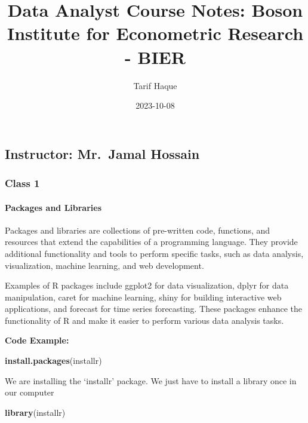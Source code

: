 \documentclass[
]{article}
\title{Data Analyst Course Notes: Boson Institute for Econometric
Research - BIER}
\author{Tarif Haque}
\date{2023-10-08}
\newenvironment{Shaded}{\begin{snugshade}}{\end{snugshade}}
\newcommand{\FunctionTok}[1]{\textcolor[rgb]{0.13,0.29,0.53}{\textbf{#1}}}
\newcommand{\NormalTok}[1]{#1}
\newcommand{\StringTok}[1]{\textcolor[rgb]{0.31,0.60,0.02}{#1}}
\begin{document}
\maketitle

\hypertarget{instructor-mr.-jamal-hossain}{%
\subsection{Instructor: Mr.~Jamal
Hossain}\label{instructor-mr.-jamal-hossain}}

\hypertarget{class-1}{%
\subsubsection{Class 1}\label{class-1}}

\hypertarget{packages-and-libraries}{%
\paragraph{Packages and Libraries}\label{packages-and-libraries}}

Packages and libraries are collections of pre-written code, functions,
and resources that extend the capabilities of a programming language.
They provide additional functionality and tools to perform specific
tasks, such as data analysis, visualization, machine learning, and web
development.

Examples of R packages include ggplot2 for data visualization, dplyr for
data manipulation, caret for machine learning, shiny for building
interactive web applications, and forecast for time series forecasting.
These packages enhance the functionality of R and make it easier to
perform various data analysis tasks.

\textbf{Code Example:}

\begin{Shaded}
\begin{Highlighting}[]
\FunctionTok{install.packages}\NormalTok{(}\StringTok{\textquotesingle{}installr\textquotesingle{}}\NormalTok{)}
\end{Highlighting}
\end{Shaded}

We are installing the `installr' package. We just have to install a
library once in our computer

\begin{Shaded}
\begin{Highlighting}[]
\FunctionTok{library}\NormalTok{(installr)}
\end{Highlighting}
\end{Shaded}
\end{document}

